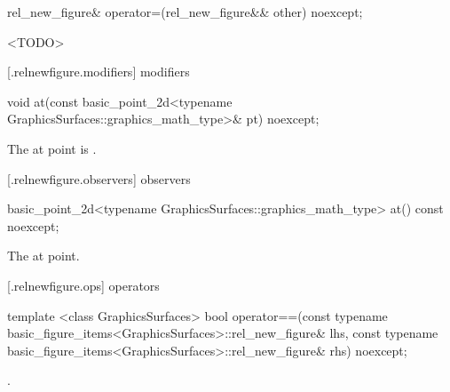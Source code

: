 %
\begin{itemdecl}
rel_new_figure& operator=(rel_new_figure&& other) noexcept;
\end{itemdecl}
\begin{itemdescr}
\pnum
\effects
<TODO>

\pnum
\returns
{}
\end{itemdescr}

 [\iotwod.relnewfigure.modifiers]{ modifiers}%

%
\begin{itemdecl}
void at(const basic_point_2d<typename GraphicsSurfaces::graphics_math_type>& pt) noexcept;
\end{itemdecl}
\begin{itemdescr}
\pnum
\effects
The at point is .
\end{itemdescr}

 [\iotwod.relnewfigure.observers]{ observers}%

%
\begin{itemdecl}
basic_point_2d<typename GraphicsSurfaces::graphics_math_type> at() const noexcept;
\end{itemdecl}
\begin{itemdescr}
\pnum
\returns
The at point.
\end{itemdescr}

 [\iotwod.relnewfigure.ops]{ operators}%

%
\begin{itemdecl}
template <class GraphicsSurfaces>
bool operator==(const typename basic_figure_items<GraphicsSurfaces>::rel_new_figure& lhs,
  const typename basic_figure_items<GraphicsSurfaces>::rel_new_figure& rhs) noexcept;
\end{itemdecl}
\begin{itemdescr}
\pnum
\returns
{}.
\end{itemdescr}
